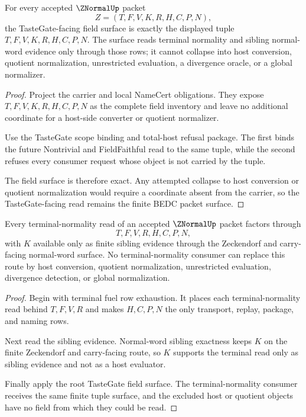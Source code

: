 \begin{theorem}
\label{thm:znormal-root-tastegate-field-surface}
For every accepted $\ZNormalUp$ packet
$$
Z=(T,F,V,K,R,H,C,P,N),
$$
the TasteGate-facing field surface is exactly the displayed tuple $T,F,V,K,R,H,C,P,N$. The surface reads terminal normality and sibling normal-word evidence only through those rows; it cannot collapse into host conversion, quotient normalization, unrestricted evaluation, a divergence oracle, or a global normalizer.
\end{theorem}
\begin{proof}
Project the carrier and local NameCert obligations. They expose $T,F,V,K,R,H,C,P,N$ as the complete field inventory and leave no additional coordinate for a host-side converter or quotient normalizer.

Use the TasteGate scope binding and total-host refusal package. The first binds the future Nontrivial and FieldFaithful read to the same tuple, while the second refuses every consumer request whose object is not carried by the tuple.

The field surface is therefore exact. Any attempted collapse to host conversion or quotient normalization would require a coordinate absent from the carrier, so the TasteGate-facing read remains the finite BEDC packet surface.
\end{proof}

\begin{theorem}
\label{thm:znormal-terminal-normality-scope-package}
Every terminal-normality read of an accepted $\ZNormalUp$ packet factors through
$$
T,F,V,R,H,C,P,N,
$$
with $K$ available only as finite sibling evidence through the Zeckendorf and carry-facing normal-word surface. No terminal-normality consumer can replace this route by host conversion, quotient normalization, unrestricted evaluation, divergence detection, or global normalization.
\end{theorem}
\begin{proof}
Begin with terminal fuel row exhaustion. It places each terminal-normality read behind $T,F,V,R$ and makes $H,C,P,N$ the only transport, replay, package, and naming rows.

Next read the sibling evidence. Normal-word sibling exactness keeps $K$ on the finite Zeckendorf and carry-facing route, so $K$ supports the terminal read only as sibling evidence and not as a host evaluator.

Finally apply the root TasteGate field surface. The terminal-normality consumer receives the same finite tuple surface, and the excluded host or quotient objects have no field from which they could be read.
\end{proof}

